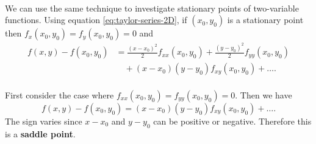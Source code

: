 \documentclass[../multivariate_calculus.tex]{subfiles}
\begin{document}
        \paragraph{}
        We can use the same technique to investigate stationary points of two-variable functions.
        Using equation \ref{eq:taylor-series-2D}, if $(x_0,y_0)$ is a stationary point then $f_x(x_0,y_0)=f_y(x_0,y_0)=0$ and
        \begin{align}
            f(x,y)-f(x_0,y_0)&=\frac{(x-x_0)^2}{2}f_{xx}(x_0,y_0)+\frac{(y-y_0)^2}{2}f_{yy}(x_0,y_0)\\
            &\quad+(x-x_0)(y-y_0)f_{xy}(x_0,y_0)+\dots.
        \end{align}

        \paragraph{}
        First consider the case where $f_{xx}(x_0,y_0)=f_{yy}(x_0,y_0)=0$.
        Then we have
        \begin{equation}
            f(x,y)-f(x_0,y_0)=(x-x_0)(y-y_0)f_{xy}(x_0,y_0)+\dots.
        \end{equation}
        The sign varies since $x-x_0$ and $y-y_0$ can be positive or negative.
        Therefore this is a \textbf{saddle point}.
\end{document}
